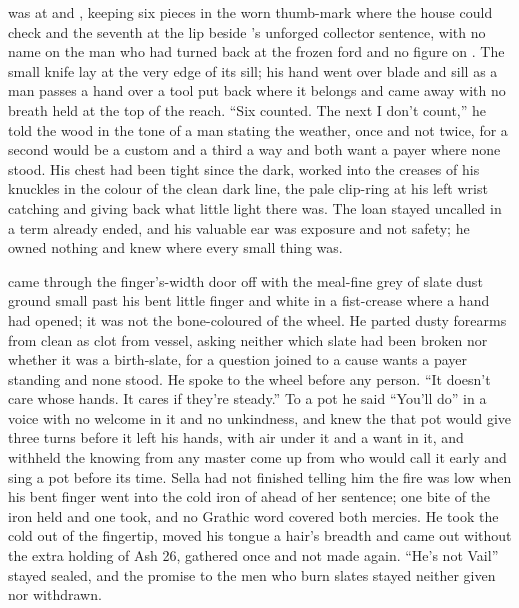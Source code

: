  was at  and , keeping six pieces in the worn thumb-mark where the house could check and the seventh at the lip beside 's unforged collector sentence, with no name on the man who had turned back at the frozen ford and no figure on . The small knife lay at the very edge of its sill; his hand went over blade and sill as a man passes a hand over a tool put back where it belongs and came away with no breath held at the top of the reach. “Six counted. The next I don't count,” he told the wood in the tone of a man stating the weather, once and not twice, for a second would be a custom and a third a way and both want a payer where none stood. His chest had been tight since the dark,  worked into the creases of his knuckles in the colour of the clean dark line, the pale clip-ring at his left wrist catching and giving back what little light there was. The loan stayed uncalled in a term already ended, and his valuable ear was exposure and not safety; he owned nothing and knew where every small thing was.

 came through the finger's-width door off  with the meal-fine grey of slate dust ground small past his bent little finger and white in a fist-crease where a hand had opened; it was not the bone-coloured  of the wheel. He parted dusty forearms from clean as clot from vessel, asking neither which slate had been broken nor whether it was a birth-slate, for a question joined to a cause wants a payer standing and none stood. He spoke to the wheel before any person. “It doesn't care whose hands. It cares if they're steady.” To a pot he said “You'll do” in a voice with no welcome in it and no unkindness, and knew the  that pot would give three turns before it left his hands, with air under it and a want in it, and withheld the knowing from any master come up from  who would call it early and sing a pot before its time. Sella had not finished telling him the fire was low when his bent finger went into the cold iron of  ahead of her sentence; one bite of the iron held and one took, and no Grathic word covered both mercies. He took the cold out of the fingertip, moved his tongue a hair's breadth and came out without the extra holding of Ash 26, gathered once and not made again. “He's not Vail” stayed sealed, and the promise to the men who burn slates stayed neither given nor withdrawn.

